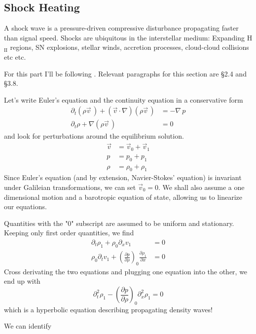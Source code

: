 \subsection{Shock Heating}

A shock wave is a pressure-driven compressive disturbance propagating faster than signal speed. Shocks are ubiquitous in the interstellar medium: Expanding H$_{\text{II}}$ regions, SN explosions, stellar winds, accretion processes, cloud-cloud collisions etc etc.
\par For this part I'll be following \cite{Frank_King_Raine_2002}. Relevant paragraphs for this section are §2.4 and §3.8.
\par Let's write Euler's equation and the continuity equation in a conservative form 
\begin{align*}
    \partial_{t}(\rho\vec{v}\,) + (\vec{v}\cdot\nabla)(\rho\vec{v}\,) &= -\nabla\, p\\
    \partial_{t}\rho +\nabla(\rho\vec{v}\,) &= 0
\end{align*}
and look for perturbations around the equilibrium solution.
\begin{align*}
    \vec{v} &= \vec{v}_{0} + \vec{v}_{1}\\
    p &= p_{0}+p_{1}\\
    \rho &= \rho_{0}+\rho_{1}
\end{align*}
Since Euler's equation (and by extension, Navier-Stokes' equation) is invariant under Galileian transformations, we can set $\vec{v}_{0} = 0$. We shall also assume a one dimensional motion and a barotropic equation of state, allowing us to linearize our equations.
\par Quantities with the "0" subscript are assumed to be uniform and stationary. Keeping only first order quantities, we find
\begin{align*}
    \partial_{t}\rho_{1}+\rho_{0}\partial_{x}v_{1} &= 0\\
    \rho_{0}\partial_{t}v_{1} +\left(\frac{\partial p}{\partial \rho}\right)_{0}\frac{\partial\rho_{1}}{\partial x} &=0
\end{align*}
Cross derivating the two equations and plugging one equation into the other, we end up with 
\begin{equation}
    \partial^{2}_{t}\rho_{1}-\left(\frac{\partial p}{\partial \rho}\right)_{0}\partial^{2}_{x}\rho_{1} = 0
    \label{eq:soundwaves}
\end{equation}
which is a hyperbolic equation describing propagating density waves!
\par We can identify
